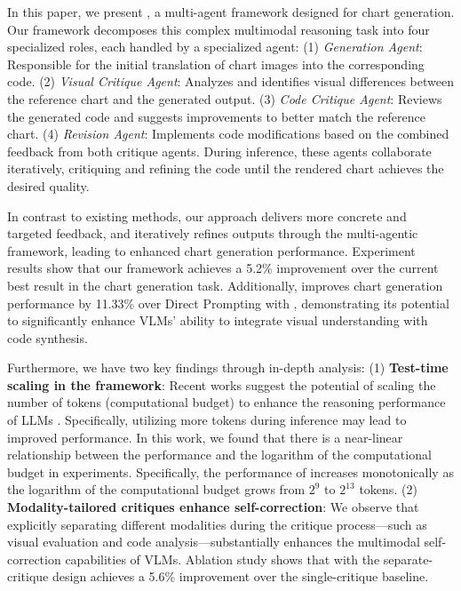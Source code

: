 In this paper, we present \model{}, a multi-agent framework designed for chart generation. Our framework decomposes this complex multimodal reasoning task into four specialized roles, each handled by a specialized agent: (1) \textit{Generation Agent}: Responsible for the initial translation of chart images into the corresponding code. (2) \textit{Visual Critique Agent}: Analyzes and identifies visual differences between the reference chart and the generated output. (3) \textit{Code Critique Agent}: Reviews the generated code and suggests improvements to better match the reference chart. (4)  \textit{Revision Agent}: Implements code modifications based on the combined feedback from both critique agents. During inference, these agents collaborate iteratively, critiquing and refining the code until the rendered chart achieves the desired quality. 



In contrast to existing methods, our approach delivers more concrete and targeted feedback, and iteratively refines outputs through the multi-agentic framework, leading to enhanced chart generation performance. Experiment results show that our framework achieves a 5.2\% improvement over the current best result in the chart generation task. Additionally, \model{} improves chart generation performance by 11.33\% over Direct Prompting with \llama,
demonstrating its potential to significantly enhance VLMs' ability to integrate visual understanding with code synthesis.

Furthermore, we have two key findings through in-depth analysis: (1) \textbf{Test-time scaling in the \model{} framework}: Recent works suggest the potential of scaling the number of tokens (computational budget) to enhance the reasoning performance of LLMs \citep{snell2024scaling, muennighoff2025s1}. Specifically, utilizing more tokens during inference may lead to improved performance. In this work, we found that there is a near-linear relationship between the performance and the logarithm of the computational budget in experiments. Specifically, the performance of \model{} increases monotonically as the logarithm of the computational budget grows from $2^9$ to $2^{13}$ tokens. 
(2) \textbf{Modality-tailored critiques enhance self-correction}: We observe that explicitly separating different modalities during the critique process—such as visual evaluation and code analysis—substantially enhances the multimodal self-correction capabilities of VLMs. Ablation study shows that \model{} with the separate-critique design achieves a 5.6\% improvement over the single-critique baseline.

